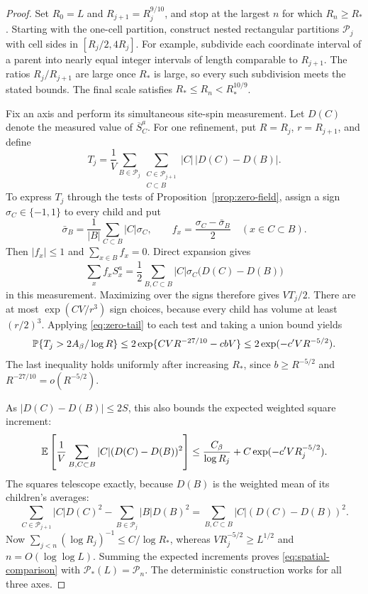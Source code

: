 \begin{proof}
Set $R_0=L$ and $R_{j+1}=R_j^{9/10}$, and stop at the largest $n$
for which $R_n\ge R_*$.  Starting with the one-cell partition, construct
nested rectangular partitions $\mathcal P_j$ with cell sides in
$[R_j/2,4R_j]$.  For example, subdivide each coordinate interval of a
parent into nearly equal integer intervals of length comparable to
$R_{j+1}$.  The ratios $R_j/R_{j+1}$ are large once $R_*$ is large,
so every such subdivision meets the stated bounds.  The final scale
satisfies $R_*\le R_n<R_*^{10/9}$.

Fix an axis and perform its simultaneous site-spin measurement.
Let $D(C)$ denote the measured value of $\overline S_C^a$.  For one
refinement, put $R=R_j$, $r=R_{j+1}$, and define
\[
 T_j=\frac1V\sum_{B\in\mathcal P_j}
             \sum_{\substack{C\in\mathcal P_{j+1}\\C\subset B}}
               |C|\,|D(C)-D(B)|.
\]
To express $T_j$ through the tests of Proposition~\ref{prop:zero-field},
assign a sign $\sigma_C\in\{-1,1\}$ to every child and put
\[
 \bar\sigma_B=\frac1{|B|}\sum_{C\subset B}|C|\sigma_C,
 \qquad
 f_x=\frac{\sigma_C-\bar\sigma_B}{2}
       \quad(x\in C\subset B).
\]
Then $|f_x|\le1$ and $\sum_{x\in B}f_x=0$.  Direct expansion gives
\[
 \sum_x f_xS_x^a
   =\frac12\sum_{B,C\subset B}|C|\sigma_C\bigl(D(C)-D(B)\bigr)
\]
in this measurement.  Maximizing over the signs therefore gives $VT_j/2$.
There are at most $\exp(CV/r^3)$ sign choices, because every child has
volume at least $(r/2)^3$.  Applying \eqref{eq:zero-tail} to each test
and taking a union bound yields
\[
 \mathbb P\{T_j>2A_\beta/\log R\}
 \le 2\exp\{CV R^{-27/10}-cbV\}
 \le 2\exp(-c'VR^{-5/2}).
\]
The last inequality holds uniformly after increasing $R_*$, since
$b\ge R^{-5/2}$ and $R^{-27/10}=o(R^{-5/2})$.

As $|D(C)-D(B)|\le2S$, this also bounds the expected weighted square
increment:
\[
 \mathbb E\left[\frac1V\sum_{B,C\subset B}|C|
                 (D(C)-D(B))^2\right]
 \le \frac{C_\beta}{\log R_j}
       +C\exp(-c'VR_j^{-5/2}).
\]
The squares telescope exactly, because $D(B)$ is the weighted mean of
its children's averages:
\[
 \sum_{C\in\mathcal P_{j+1}}|C|D(C)^2
 -\sum_{B\in\mathcal P_j}|B|D(B)^2
 =\sum_{B,C\subset B}|C|(D(C)-D(B))^2.
\]
Now
$\sum_{j<n}(\log R_j)^{-1}\le C/\log R_*$, whereas
$VR_j^{-5/2}\ge L^{1/2}$ and $n=O(\log\log L)$.
Summing the expected increments proves \eqref{eq:spatial-comparison}
with $\mathcal P_*(L)=\mathcal P_n$.  The deterministic construction
works for all three axes.
\end{proof}
